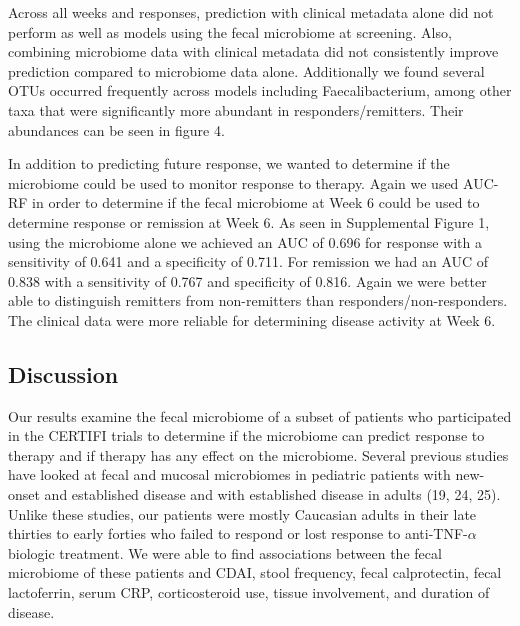 \documentclass[11pt,]{article}
\begin{document}
Across all weeks and responses, prediction with clinical metadata alone
did not perform as well as models using the fecal microbiome at
screening. Also, combining microbiome data with clinical metadata did
not consistently improve prediction compared to microbiome data alone.
Additionally we found several OTUs occurred frequently across models
including Faecalibacterium, among other taxa that were significantly
more abundant in responders/remitters. Their abundances can be seen in
figure 4.

In addition to predicting future response, we wanted to determine if the
microbiome could be used to monitor response to therapy. Again we used
AUC-RF in order to determine if the fecal microbiome at Week 6 could be
used to determine response or remission at Week 6. As seen in
Supplemental Figure 1, using the microbiome alone we achieved an AUC of
0.696 for response with a sensitivity of 0.641 and a specificity of
0.711. For remission we had an AUC of 0.838 with a sensitivity of 0.767
and specificity of 0.816. Again we were better able to distinguish
remitters from non-remitters than responders/non-responders. The
clinical data were more reliable for determining disease activity at
Week 6.

\subsection{Discussion}\label{discussion}

Our results examine the fecal microbiome of a subset of patients who
participated in the CERTIFI trials to determine if the microbiome can
predict response to therapy and if therapy has any effect on the
microbiome. Several previous studies have looked at fecal and mucosal
microbiomes in pediatric patients with new-onset and established disease
and with established disease in adults (19, 24, 25). Unlike these
studies, our patients were mostly Caucasian adults in their late
thirties to early forties who failed to respond or lost response to
anti-TNF-\({\alpha}\) biologic treatment. We were able to find
associations between the fecal microbiome of these patients and CDAI,
stool frequency, fecal calprotectin, fecal lactoferrin, serum CRP,
corticosteroid use, tissue involvement, and duration of disease.
\end{document}
